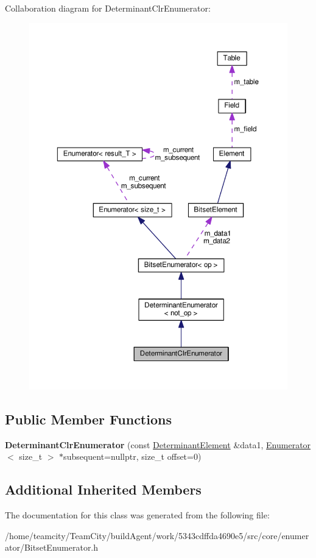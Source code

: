 Collaboration diagram for Determinant\+Clr\+Enumerator\+:\nopagebreak
\begin{figure}[H]
\begin{center}
\leavevmode
\includegraphics[width=350pt]{classDeterminantClrEnumerator__coll__graph}
\end{center}
\end{figure}
\subsection*{Public Member Functions}
\begin{DoxyCompactItemize}
\item 
{\bfseries Determinant\+Clr\+Enumerator} (const \hyperlink{classDeterminantElement}{Determinant\+Element} \&data1, \hyperlink{classEnumerator}{Enumerator}$<$ size\+\_\+t $>$ $\ast$subsequent=nullptr, size\+\_\+t offset=0)\hypertarget{classDeterminantClrEnumerator_ac62b7f64a2dd7e40b30545cf0d9344df}{}\label{classDeterminantClrEnumerator_ac62b7f64a2dd7e40b30545cf0d9344df}

\end{DoxyCompactItemize}
\subsection*{Additional Inherited Members}


The documentation for this class was generated from the following file\+:\begin{DoxyCompactItemize}
\item 
/home/teamcity/\+Team\+City/build\+Agent/work/5343cdffda4690e5/src/core/enumerator/Bitset\+Enumerator.\+h\end{DoxyCompactItemize}

